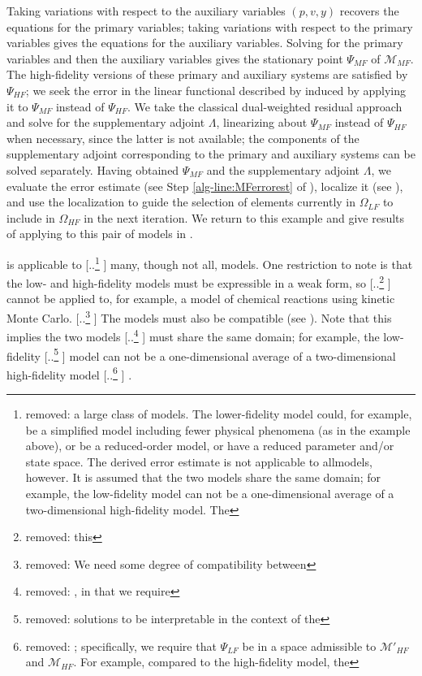 \documentclass[review,sort&compress]{elsarticle}
\providecommand{\DIFaddtex}[1]{{\protect\color{blue} \sf #1}} %
\providecommand{\DIFdeltex}[1]{{\protect\color{red} [..\footnote{removed: #1} ]}} %
\providecommand{\DIFaddbegin}{} %
\providecommand{\DIFaddend}{} %
\providecommand{\DIFdelbegin}{} %
\providecommand{\DIFdelend}{} %
\providecommand{\DIFadd}[1]{\texorpdfstring{\DIFaddtex{#1}}{#1}} %
\providecommand{\DIFdel}[1]{\texorpdfstring{\DIFdeltex{#1}}{}} %
\newcommand{\DIFscaledelfig}{0.5}
\newlength{\DIFdelgraphicswidth} %
\newlength{\DIFdelgraphicsheight} %
\newcommand{\DIFaddincludegraphics}[2][]{{\color{blue}\fbox{\DIFOincludegraphics[#1]{#2}}}} %
\newcommand{\DIFdelincludegraphics}[2][]{%
\sbox{\DIFdelgraphicsbox}{\DIFOincludegraphics[#1]{#2}}%
\settoboxwidth{\DIFdelgraphicswidth}{\DIFdelgraphicsbox} %
\settoboxtotalheight{\DIFdelgraphicsheight}{\DIFdelgraphicsbox} %
\scalebox{\DIFscaledelfig}{%
\parbox[b]{\DIFdelgraphicswidth}{\usebox{\DIFdelgraphicsbox}\\[-\baselineskip] \rule{\DIFdelgraphicswidth}{0em}}\llap{\resizebox{\DIFdelgraphicswidth}{\DIFdelgraphicsheight}{%
\setlength{\unitlength}{\DIFdelgraphicswidth}%
\begin{picture}(1,1)%
\thicklines\linethickness{2pt} %
{\color[rgb]{1,0,0}\put(0,0){\framebox(1,1){}}}%
{\color[rgb]{1,0,0}\put(0,0){\line( 1,1){1}}}%
{\color[rgb]{1,0,0}\put(0,1){\line(1,-1){1}}}%
\end{picture}%
}\hspace*{3pt}}} %
} %
\DeclareRobustCommand{\DIFaddbegin}{\DIFOaddbegin \let\includegraphics\DIFaddincludegraphics} %
\DeclareRobustCommand{\DIFaddend}{\DIFOaddend \let\includegraphics\DIFOincludegraphics} %
\DeclareRobustCommand{\DIFdelbegin}{\DIFOdelbegin \let\includegraphics\DIFdelincludegraphics} %
\DeclareRobustCommand{\DIFdelend}{\DIFOaddend \let\includegraphics\DIFOincludegraphics} %
\begin{document}
Taking variations with respect to the auxiliary variables $(p,v,y)$ recovers the equations for the primary variables; taking variations with respect to the primary variables gives the equations for the auxiliary variables. Solving for the primary variables and then the auxiliary variables gives the stationary point $\Psi_{MF}$ of $\mathcal{M}_{MF}$. 
The high-fidelity versions of these primary and auxiliary systems are satisfied by $\Psi_{HF}$; we seek the error in the linear functional described by  induced by applying it to $\Psi_{MF}$ instead of $\Psi_{HF}$. We take the classical dual-weighted residual approach and solve for the supplementary adjoint $\Lambda$, linearizing about $\Psi_{MF}$ instead of $\Psi_{HF}$ when necessary, since the latter is not available; the components of the supplementary adjoint corresponding to the primary and auxiliary systems can be solved separately. Having obtained $\Psi_{MF}$ and the supplementary adjoint $\Lambda$, we evaluate the error estimate (see Step \ref{alg-line:MFerrorest} of ), localize it (see ), and use the localization to guide the selection of elements currently in $\Omega_{LF}$ to include in $\Omega_{HF}$ in the next iteration. We return to this example and give results of applying  to this pair of models in .

 is applicable to \DIFdelbegin \DIFdel{a large class of models. The lower-fidelity model could, for example, be a simplified model including fewer physical phenomena (as in the example above), or be a reduced-order model, or have a reduced parameter and/or state space. The derived error estimate is not applicable to allmodels, however. It is assumed that the two models share the same domain; for example, the low-fidelity model can not be a one-dimensional average of a two-dimensional high-fidelity model. The }\DIFdelend \DIFaddbegin \DIFadd{many, though not all, models. One restriction to note is that the }\DIFaddend low- and high-fidelity models must be expressible in a weak form, so \DIFdelbegin \DIFdel{this }\DIFdelend \DIFaddbegin \DIFadd{ }\DIFaddend cannot be applied to, for example, a model of chemical reactions using kinetic Monte Carlo. \DIFdelbegin \DIFdel{We need some degree of compatibility between }\DIFdelend \DIFaddbegin \DIFadd{The models must also be compatible (see ). Note that this implies }\DIFaddend the two models \DIFdelbegin \DIFdel{, in that we require }\DIFdelend \DIFaddbegin \DIFadd{must share the same domain; for example, }\DIFaddend the low-fidelity \DIFdelbegin \DIFdel{solutions to be interpretable in the context of the }\DIFdelend \DIFaddbegin \DIFadd{model can not be a one-dimensional average of a two-dimensional }\DIFaddend high-fidelity model\DIFdelbegin \DIFdel{; specifically, we require that $\Psi_{LF}$ be in a space admissible to $\mathcal{M}'_{HF}$ and $\mathcal{M}_{HF}$. For example, compared to the high-fidelity model, the }\DIFdelend \DIFaddbegin \DIFadd{. 
}
\end{document}
